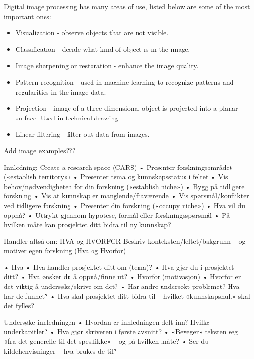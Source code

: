 Digital image processing has many areas of use, listed below are some of the most important ones:
\begin{itemize}
\item Visualization - observe objects that are not visible.
\item Classification - decide what kind of object is in the image.
\item Image sharpening or restoration - enhance the image quality.
\item Pattern recognition - used in machine learning to recognize patterns and regularities in the image data.
\item Projection - image of a three-dimensional object is projected into a planar surface. Used in technical drawing.
\item Linear filtering - filter out data from images.
\end{itemize}

\cite{book:digital_image_processing, book:machine_vision}

{\color{red}Add image examples???}






{\color{red}
Innledning: Create a research space (CARS)
• Presenter forskningsområdet («establish territory»)
    • Presenter tema og kunnskapsstatus i feltet
• Vis behov/nødvendigheten for din forskning («establish niche»)
    • Bygg på tidligere forskning
    • Vis at kunnskap er manglende/fraværende
    • Vis spørsmål/konflikter ved tidligere forskning
• Presenter din forskning («occupy niche»)
    • Hva vil du oppnå?
    • Uttrykt gjennom hypotese, formål eller forskningsspørsmål
    • På hvilken måte kan prosjektet ditt bidra til ny kunnskap?


Handler altså om: HVA og HVORFOR
Beskriv konteksten/feltet/bakgrunn – og motiver egen forskning (Hva og Hvorfor)

• Hva
    • Hva handler prosjektet ditt om (tema)?
    • Hva gjør du i prosjektet ditt?
    • Hva ønsker du å oppnå/finne ut?
• Hvorfor (motivasjon)
    • Hvorfor er det viktig å undersøke/skrive om det?
    • Har andre undersøkt problemet? Hva har de funnet?
    • Hva skal prosjektet ditt bidra til – hvilket «kunnskapshull» skal det fylles?


Undersøke innledningen
• Hvordan er innledningen delt inn? Hvilke underkapitler?
• Hva gjør skriveren i første avsnitt?
    • «Beveger» teksten seg «fra det generelle til det spesifikke» – og på hvilken måte?
• Ser du kildehenvisninger – hva brukes de til?


}




